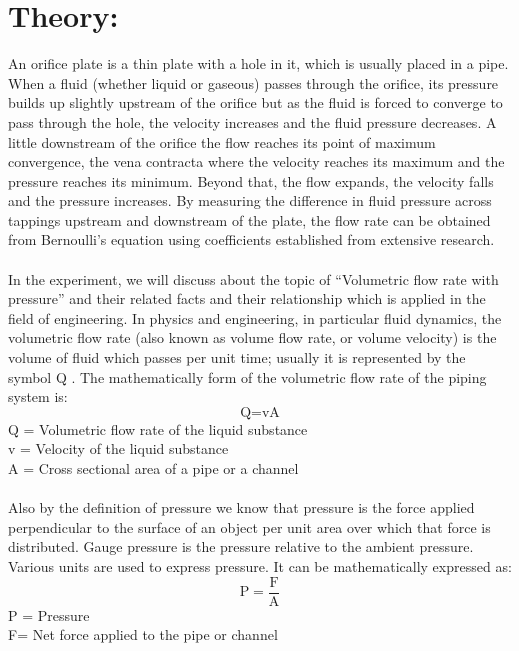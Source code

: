 \documentclass[12pt,a4paper]{article}
\begin{document}
\section{Theory:}
An orifice plate is a thin plate with a hole in it, which is usually placed in a pipe. When a fluid (whether liquid or gaseous) passes through the orifice, its pressure builds up slightly upstream of the orifice but as the fluid is forced to converge to pass through the hole, the velocity increases and the fluid pressure decreases. A little downstream of the orifice the flow reaches its point of maximum convergence, the vena contracta where the velocity reaches its maximum and the pressure reaches its minimum. Beyond that, the flow expands, the velocity falls and the pressure increases. By measuring the difference in fluid pressure across tappings upstream and downstream of the plate, the flow rate can be obtained from Bernoulli's equation using coefficients established from extensive research.\\
\\In the experiment, we will discuss about the topic of “Volumetric flow rate with pressure” and their related facts and their relationship which is applied in the field of engineering. In physics and engineering, in particular fluid dynamics, the volumetric flow rate (also known as volume flow rate, or volume velocity) is the volume of fluid which passes per unit time; usually it is represented by the symbol Q .
The mathematically form of the volumetric flow rate of the piping system is:
\begin{equation}
	\text{Q} = \text{v} \text{A}
\end{equation}
Q = Volumetric flow rate of the liquid substance\\
v = Velocity of the liquid substance\\
A = Cross sectional area of a pipe or a channel\\
\\Also by the definition of pressure we know that pressure is the force applied perpendicular to the surface of an object per unit area over which that force is distributed. Gauge pressure is the pressure relative to the ambient pressure. Various units are used to express pressure. It can be mathematically expressed as:
\begin{equation}
	\text{P} = \frac{\text{F}}{\text{A}}
\end{equation}
P = Pressure\\
F= Net force applied to the pipe or channel\\
\end{document}
